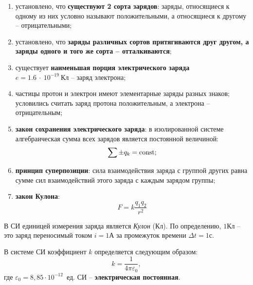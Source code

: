     \begin{enumerate}
    
        \item установлено, что \textbf{существуют 2 сорта зарядов}: заряды, 
        относящиеся к одному из них условно называют положительными, а 
        относящиеся к другому -- отрицательными;
    
        \item установлено, что \textbf{заряды различных сортов притягиваются 
        друг другом, а заряды одного и того же сорта -- отталкиваются};
    
        \item существует \textbf{наименьшая порция электрического заряда}\\ 
        \(e = 1.6~\cdot~10^{-19}~\text{Кл}\) -- заряд электрона;
    
        \item частицы протон и электрон имеют элементарные заряды разных 
        знаков; условились считать заряд протона положительным, а электрона -- 
        отрицательным;
    
        \item \textbf{закон сохранения электрического заряда}: в изолированной 
        системе алгебраическая сумма всех зарядов является постоянной 
        величиной:
        \[
            \sum\pm q_k = \mathrm{const};
        \]
        
        \item \textbf{принцип суперпозиции}: сила взаимодействия заряда с 
        группой других равна сумме сил взаимодействий этого заряда с каждым 
        зарядом группы;
    
        \item \textbf{закон Кулона}:
        \begin{equation}
            F = k\frac{q_1q_2}{r^2} \label{eq1:1}
        \end{equation}
    
    \end{enumerate}


    В СИ единицей измерения заряда является \textit{Кулон} (Кл). По 
    определению, \( 1\text{Кл} \) -- это заряд переносимый током 
    \( i = 1\text{А} \) за промежуток времени \( \Delta t = 1\text{с} \).
  
    В системе СИ коэффициент \( k \) определяется следующим образом:
    \[
        k = \frac{1}{4\pi\varepsilon_0},
    \]
    где \( \varepsilon_0 = 8,85\cdot10^{-12} \)~ед. СИ -- 
    \textbf{электрическая постоянная}.
  
